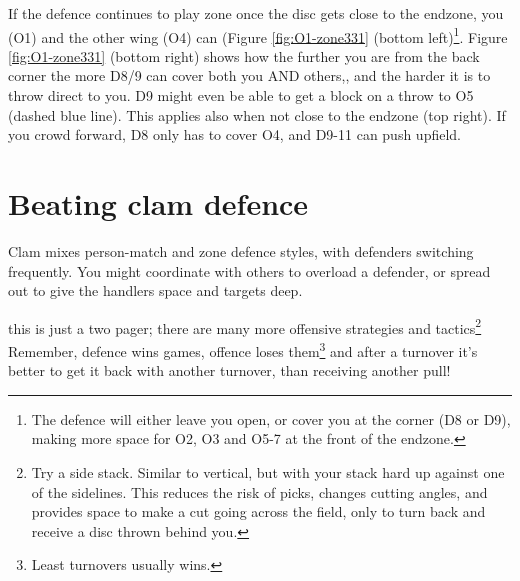 \documentclass{tufte-handout}
\begin{document}
If the defence 
continues to play zone 
once the disc 
gets close to the endzone, 
you (O1) 
and the other wing (O4) 
can 
(Figure \ref{fig:O1-zone331} (bottom left)\footnote{ 
The defence 
will either  
leave you open,
or cover you
at the corner
(D8 
or D9), 
making more space 
for O2, 
O3 and
O5-7 
at the front of the endzone.}.
Figure \ref{fig:O1-zone331} (bottom right) shows 
how the further 
you are from the back corner 
the more D8/9 
can cover both you
AND others,, 
and the harder 
it is to throw direct to you.
D9 might even be able to get a block
on a throw to O5
(dashed blue line). 
This applies also when 
not close to the endzone 
(top right).
If you crowd forward,
D8 only has to cover O4, 
and D9-11 
can push upfield.


\section{Beating clam defence}\label{sec:zone}
Clam mixes person-match 
and zone defence styles, 
with defenders 
switching frequently.
You might
coordinate 
with others  
to overload 
a defender, 
or spread out 
to give the handlers 
space 
and targets deep. 

this is just a two pager; 
there are many more 
offensive strategies 
and tactics\footnote{
Try 
a side stack. 
Similar to vertical, 
but with your stack 
hard up against 
one of the sidelines. 
This reduces the risk of picks, 
changes cutting angles, 
and provides space 
to make a cut going across 
the field, only to turn back 
and receive 
a disc thrown 
behind you.}
Remember, 
defence wins games, 
offence loses them\footnote{
Least turnovers 
usually wins.} 
and after a turnover 
it's better to get it back 
with another turnover, 
than receiving another pull!
\end{document}

